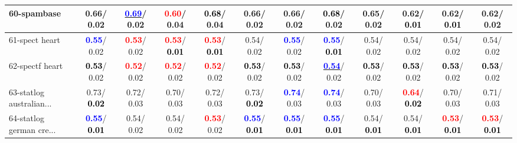 \begin{table}[h]
\begin{center}
{\begin{tabular}{lc|c|c|c|c|c|c|c|c|c|c}
60-spambase &   0.66/  0.02 & \underline{\textcolor{blue}{\textbf{  0.69}}}/  0.02 & \textcolor{red}{\textbf{  0.60}}/  0.04 & \textcolor{black}{\textbf{  0.68}}/  0.04 &   0.66/  0.02 &   0.66/  0.02 & \textcolor{black}{\textbf{  0.68}}/  0.02 &   0.65/  0.02 &   0.62/\textcolor{black}{\textbf{  0.01}} &   0.62/\textcolor{black}{\textbf{  0.01}} &   0.62/  0.02 \\ \hline
61-spect heart & \textcolor{blue}{\textbf{  0.55}}/  0.02 & \textcolor{red}{\textbf{  0.53}}/  0.02 & \textcolor{red}{\textbf{  0.53}}/\textcolor{black}{\textbf{  0.01}} & \textcolor{red}{\textbf{  0.53}}/\textcolor{black}{\textbf{  0.01}} &   0.54/  0.02 & \textcolor{blue}{\textbf{  0.55}}/  0.02 & \textcolor{blue}{\textbf{  0.55}}/\textcolor{black}{\textbf{  0.01}} &   0.54/  0.02 &   0.54/  0.02 &   0.54/  0.02 &   0.54/  0.02 \\
62-spectf heart & \textcolor{black}{\textbf{  0.53}}/  0.02 & \textcolor{red}{\textbf{  0.52}}/  0.02 & \textcolor{red}{\textbf{  0.52}}/  0.02 & \textcolor{red}{\textbf{  0.52}}/  0.02 & \textcolor{black}{\textbf{  0.53}}/  0.02 & \textcolor{black}{\textbf{  0.53}}/  0.02 & \underline{\textcolor{blue}{\textbf{  0.54}}}/  0.02 & \textcolor{black}{\textbf{  0.53}}/  0.02 & \textcolor{black}{\textbf{  0.53}}/  0.02 & \textcolor{black}{\textbf{  0.53}}/  0.02 & \textcolor{black}{\textbf{  0.53}}/  0.02 \\
63-statlog australian... &   0.73/\textcolor{black}{\textbf{  0.02}} &   0.72/  0.03 &   0.70/  0.03 &   0.72/  0.03 &   0.73/\textcolor{black}{\textbf{  0.02}} & \textcolor{blue}{\textbf{  0.74}}/  0.03 & \textcolor{blue}{\textbf{  0.74}}/  0.03 &   0.70/  0.03 & \textcolor{red}{\textbf{  0.64}}/\textcolor{black}{\textbf{  0.02}} &   0.70/  0.03 &   0.71/  0.03 \\
64-statlog german cre... & \textcolor{blue}{\textbf{  0.55}}/\textcolor{black}{\textbf{  0.01}} &   0.54/  0.02 &   0.54/  0.02 & \textcolor{red}{\textbf{  0.53}}/  0.02 & \textcolor{blue}{\textbf{  0.55}}/\textcolor{black}{\textbf{  0.01}} & \textcolor{blue}{\textbf{  0.55}}/\textcolor{black}{\textbf{  0.01}} & \textcolor{blue}{\textbf{  0.55}}/\textcolor{black}{\textbf{  0.01}} &   0.54/\textcolor{black}{\textbf{  0.01}} &   0.54/\textcolor{black}{\textbf{  0.01}} & \textcolor{red}{\textbf{  0.53}}/\textcolor{black}{\textbf{  0.01}} & \textcolor{red}{\textbf{  0.53}}/\textcolor{black}{\textbf{  0.01}} \\\end{tabular}
}\label{strats1bCIELM}
\end{center}
\end{table}
